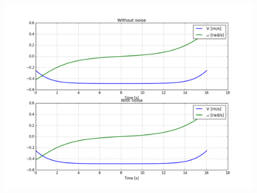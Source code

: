 \documentclass[12pt]{article}
\begin{document}
\begin{enumerate}
\begin{figure}[H]
		\includegraphics[width=\textwidth]{../Figures/hw1_1_v_control.png}
	\end{figure}
\end{enumerate}
\end{document}
